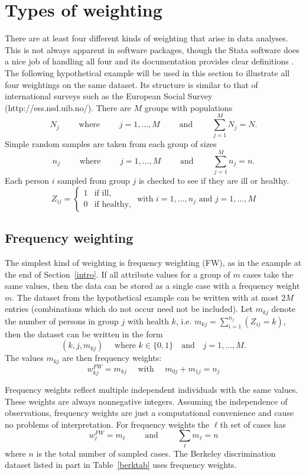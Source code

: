 \documentclass{svmult}
\begin{document}
\section{Types of weighting}
\label{types}
There are at least four different kinds of weighting that arise in data analyses.  This is not always apparent in software packages, though the Stata software does a nice job of handling all four and its documentation provides clear definitions \citep{stata:2007}.  The following hypothetical example will be used in this section to illustrate all four weightings on the same dataset.  Its structure is similar to that of international surveys such as the European Social Survey (http://ess.nsd.uib.no/).  There are $M$ groups with populations
$$N_j\qquad \text{ where }\qquad j=1,\dots,M\qquad\text{ and }\qquad \sum_{j=1}^MN_j=N.$$
Simple random samples are taken from each group of sizes
$$n_j\qquad\text{ where }\qquad j=1,\dots,M\qquad\text{ and }\qquad \sum_{j=1}^Mn_j=n.$$
Each person $i$ sampled from group $j$ is checked to see if they are ill or healthy.
\[
Z_{ij}=\begin{cases}
  1    & \text{if ill}, \\
  0    & \text{if healthy},
\end{cases}
\text{ with } i=1,\dots,n_j \text{ and } j=1,\dots,M
\]

\subsection{Frequency weighting}
\label{fw}
The simplest kind of weighting is frequency weighting (FW), as in the example at the end of Section~\ref{intro}.  If all attribute values for a group of $m$ cases take the same values, then the data can be stored as a single case with a frequency weight $m$.  The dataset from the hypothetical example can be written with at most $2M$ entries (combinations which do not occur need not be included). Let $m_{kj}$ denote the number of persons in group $j$ with health $k$, i.e. $m_{kj} = \sum_{i=1}^{n_j} \left( Z_{ij} = k \right)$, then the dataset can be written in the form
$$(k,j, m_{kj}) \quad \text{ where } k\in\{0,1\}\quad\text{and}\quad j=1,\dots,M.$$
The values $m_{kj}$ are then frequency weights:
$$w_{kj}^{FW}=m_{kj}\quad \mbox{ with } \quad m_{0j}+m_{1j}=n_j$$

Frequency  weights reflect multiple independent individuals with the same values.  These weights are always nonnegative integers.  Assuming the independence of observations, frequency weights are just a computational convenience and cause no problems of interpretation.  For frequency weights the $\ell$th set of cases has
$$w_\ell^{FW}=m_\ell \qquad \mbox{ and }\qquad \sum_\ell m_\ell = n$$
where $n$ is the total number of sampled cases.  The Berkeley discrimination dataset listed in part in Table~\ref{berktab} uses frequency weights.
\end{document}
